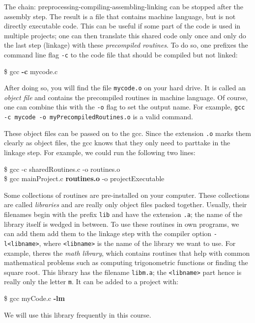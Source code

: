 The chain: preprocessing-compiling-assembling-linking can be stopped after the assembly step. The result is a file that contains machine language, but is not directly executable code. This can be useful if some part of the code is used in multiple projects; one can then translate this shared code only once and only do the last step (linkage) with these \emph{precompiled routines}. To do so, one prefixes the command line flag \texttt{-c} to the code file that should be compiled but not linked:
\begin{cmdbox}
\$ gcc \textbf{-c} mycode.c
\end{cmdbox}

After doing so, you will find the file \texttt{mycode.o} on your hard drive. It is called an \emph{object file} and contains the precompiled routines in machine language. Of course, one can combine this with the \texttt{-o} flag to set the output name. For example, \texttt{gcc -c mycode -o myPrecompiledRoutines.o} is a valid command.

These object files can be passed on to the gcc. Since the extension \texttt{.o} marks them clearly as object files, the gcc knows that they only need to parttake in the linkage step. For example, we could run the following two lines:
\begin{cmdbox}
\$ gcc -c sharedRoutines.c -o routines.o \\
\$ gcc mainProject.c \textbf{routines.o} -o projectExecutable
\end{cmdbox}

Some collections of routines are pre-installed on your computer. These collections are called \emph{libraries} and are really only object files packed together. Usually, their filenames begin with the prefix \texttt{lib} and have the extension \texttt{.a}; the name of the library itself is wedged in between. To use these routines in own programs, we can add them add them to the linkage step with the compiler option \texttt{-l<libname>}, where \texttt{<libname>} is the name of the library we want to use. For example, theres the \emph{math library}, which contains routines that help with common mathematical problems such as computing trigonometric functions or finding the square root. This library has the filename \texttt{libm.a}; the \texttt{<libname>} part hence is really only the letter \texttt{m}. It can be added to a project with:
\begin{cmdbox}
\$ gcc myCode.c \textbf{-lm}
\end{cmdbox}
We will use this library frequently in this course.

